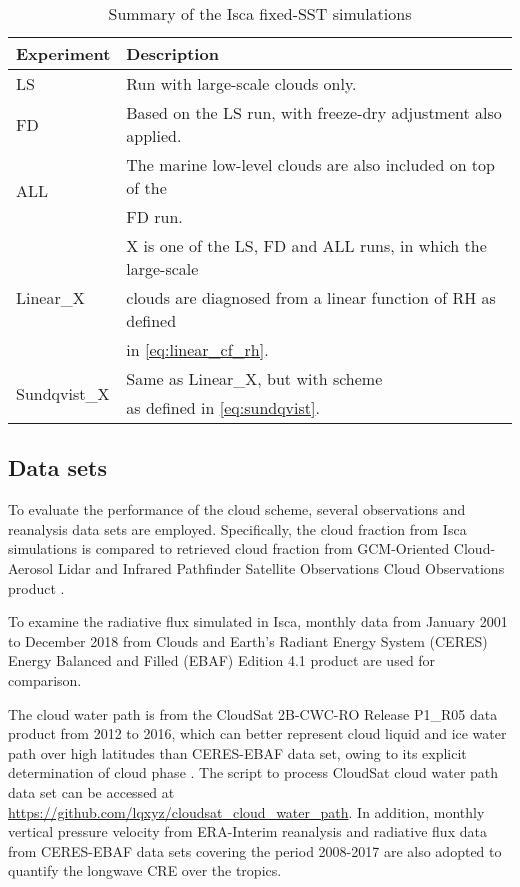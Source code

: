 \begin{table}
	\caption{Summary of the Isca fixed-SST simulations}
	\vspace{0.5em}
	\centering
	\renewcommand{\arraystretch}{1.3}
	\begin{tabular}{ll}
		\hline
		Experiment & Description \\
		\hline
		LS  & Run with large-scale clouds only. \\ 
		FD  & Based on the LS run, with freeze-dry adjustment also applied. \\ 
		\multirow{2}{*}{ALL} & The marine low-level clouds are also included on top of the \\
		    & FD run.  \\
		\multirow{3}{*}{Linear\_X} 	&  X is one of the LS, FD and ALL runs, in which the large-scale \\
		& clouds are diagnosed from a linear function of RH as defined\\
		& in \eqref{eq:linear_cf_rh}. \\
		\multirow{2}{*}{Sundqvist\_X} & Same as Linear\_X, but with \citet{Sundqvist1989} scheme\\ 
		& as defined in \eqref{eq:sundqvist}.\\
		\hline
	\end{tabular}
	\label{tab:exps}
\end{table}

\subsection{Data sets}
To evaluate the performance of the cloud scheme, several observations and reanalysis data sets are employed. Specifically, the cloud fraction from Isca simulations is compared to retrieved cloud fraction from GCM-Oriented Cloud-Aerosol Lidar and Infrared Pathfinder Satellite Observations Cloud Observations product \citep[CALIPSO-GOCCP hereafter, 2007-2015;][]{Chepfer2010}.

To examine the radiative flux simulated in Isca, monthly data from January 2001 to December 2018 from Clouds and Earth's Radiant Energy System (CERES)  Energy Balanced and Filled (EBAF) Edition 4.1 product \citep[CERES-EBAF hereafter;][]{Loeb2018} are used for comparison.

The cloud water path is from the CloudSat  2B-CWC-RO Release P1\_R05 data product \citep{Austin2009} from 2012 to 2016, which can better represent cloud liquid and ice water path over high latitudes than CERES-EBAF data set, owing to its explicit determination of cloud phase \citep{Lenaerts2017}. The script to process CloudSat cloud water path data set can be accessed at \url{https://github.com/lqxyz/cloudsat_cloud_water_path}. In addition, monthly vertical pressure velocity from ERA-Interim reanalysis and radiative flux data from CERES-EBAF data sets covering the period 2008-2017 are also adopted to quantify the longwave CRE over the tropics.

